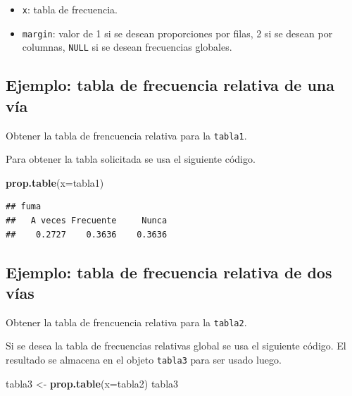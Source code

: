 \documentclass[10pt,]{krantz}
\makeatletter
\newenvironment{Shaded}{\begin{snugshade}}{\end{snugshade}}
\newcommand{\KeywordTok}[1]{\textcolor[rgb]{0.13,0.29,0.53}{\textbf{#1}}}
\newcommand{\DataTypeTok}[1]{\textcolor[rgb]{0.13,0.29,0.53}{#1}}
\newcommand{\StringTok}[1]{\textcolor[rgb]{0.31,0.60,0.02}{#1}}
\newcommand{\NormalTok}[1]{#1}
\providecommand{\tightlist}{%
  \setlength{\itemsep}{0pt}\setlength{\parskip}{0pt}}
\newenvironment{kframe}{%
\medskip{}
\setlength{\fboxsep}{.8em}
 \def\at@end@of@kframe{}%
 \ifinner\ifhmode%
  \def\at@end@of@kframe{\end{minipage}}%
  \begin{minipage}{\columnwidth}%
 \fi\fi%
 \def\FrameCommand##1{\hskip\@totalleftmargin \hskip-\fboxsep
 \colorbox{shadecolor}{##1}\hskip-\fboxsep
     \hskip-\linewidth \hskip-\@totalleftmargin \hskip\columnwidth}%
 \MakeFramed {\advance\hsize-\width
   \@totalleftmargin\z@ \linewidth\hsize
   \@setminipage}}%
 {\par\unskip\endMakeFramed%
 \at@end@of@kframe}
\renewenvironment{Shaded}{\begin{kframe}}{\end{kframe}}
\makeatother
\begin{document}
\begin{itemize}
\tightlist
\item
  \texttt{x}: tabla de frecuencia.
\item
  \texttt{margin}: valor de 1 si se desean proporciones por filas, 2 si
  se desean por columnas, \texttt{NULL} si se desean frecuencias
  globales.
\end{itemize}

\subsection*{Ejemplo: tabla de frecuencia relativa de una
vía}\label{ejemplo-tabla-de-frecuencia-relativa-de-una-via}

Obtener la tabla de frencuencia relativa para la \texttt{tabla1}.

Para obtener la tabla solicitada se usa el siguiente código.

\begin{Shaded}
\begin{Highlighting}[]
\KeywordTok{prop.table}\NormalTok{(}\DataTypeTok{x=}\NormalTok{tabla1)}
\end{Highlighting}
\end{Shaded}

\begin{verbatim}
## fuma
##   A veces Frecuente     Nunca 
##    0.2727    0.3636    0.3636
\end{verbatim}

\subsection*{Ejemplo: tabla de frecuencia relativa de dos
vías}\label{ejemplo-tabla-de-frecuencia-relativa-de-dos-vias}

Obtener la tabla de frencuencia relativa para la \texttt{tabla2}.

Si se desea la tabla de frecuencias relativas global se usa el siguiente
código. El resultado se almacena en el objeto \texttt{tabla3} para ser
usado luego.

\begin{Shaded}
\begin{Highlighting}[]
\NormalTok{tabla3 <-}\StringTok{ }\KeywordTok{prop.table}\NormalTok{(}\DataTypeTok{x=}\NormalTok{tabla2)}
\NormalTok{tabla3}
\end{Highlighting}
\end{Shaded}
\end{document}

